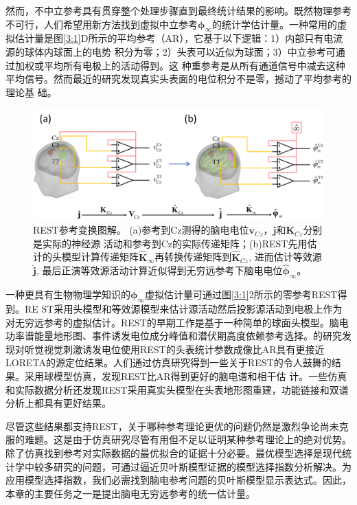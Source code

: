 然而，不中立参考具有贯穿整个处理步骤直到最终统计结果的影响。既然物理参考不可行，人们希望用新方法找到虚拟中立参考$\mathbf{\phi}_{\infty}$的统计学估计量。一种常用的虚拟估计量是图\ref{3:1}D所示的平均参考（AR），它基于以下逻辑：1）内部只有电流源的球体内球面上的电势
积分为零；2）头表可以近似为球面；3）中立参考可通过加权或平均所有电极上的活动得到。这
种重参考是从所有通道信号中减去这种平均信号。然而最近的研究发现真实头表面的电位积分不是零，撼动了平均参考的理论基
础。
\begin{figure}[!h]
	\centering
	\includegraphics[width=15cm]{pic/Frontier/figure2.png}
	\caption{REST参考变换图解。 (a)参考到Cz测得的脑电电位$\mathbf{v}_{Cz}$，$\mathbf{j}$和$\mathbf{K}_{Cz}$分别是实际的神经源
	活动和参考到Cz的实际传递矩阵；(b)REST先用估计的头模型计算传递矩阵$\hat{\mathbf{K}}_\infty$再转换传递矩阵到$\hat{\mathbf{K}}_{Cz}$, 进而估计等效源$\hat{\mathbf{j}}$, 最后正演等效源活动计算近似得到无穷远参考下脑电电位$\hat{\mathbf{\phi}}_\infty$。}
	\label{3:2}
\end{figure}
一种更具有生物物理学知识的$\mathbf{\phi}_{\infty}$虚拟估计量可通过图\ref{3:1}2所示的零参考REST得到。RE
ST采用头模型和等效源模型来估计源活动然后投影源活动到电极上作为对无穷远参考的虚拟估计。REST的早期工作是基于一种简单的球面头模型。脑电功率谱能量地形图、事件诱发电位成分峰值和潜伏期高度依赖参考选择。\cite{tian_why_2013}的研究发现对听觉视觉刺激诱发电位使用REST的头表统计参数成像比AR具有更接近LORETA的源定位结果。人们通过仿真研究得到一些关于REST的令人鼓舞的结果。采用球模型仿真，\cite{marzetti_l_use_2007,qin_comparative_2010}发现REST比AR得到更好的脑电谱和相干估
计。一些仿真和实际数据分析还发现REST采用真实头模型在头表地形图重建，功能链接和双谱分析上都具有更好结果。

尽管这些结果都支持REST，关于哪种参考理论更优的问题仍然是激烈争论尚未克服的难题。这是由于仿真研究尽管有用但不足以证明某种参考理论上的绝对优势。除了仿真找到参考对实际数据的最优拟合的证据十分必要。最优模型选择是现代统计学中较多研究的问题，可通过逼近贝叶斯模型证据的模型选择指数分析解决。为应用模型选择指数，我们必需找到脑电参考问题的贝叶斯模型显示表达式。因此，本章的主要任务之一是提出脑电无穷远参考的统一估计量。

